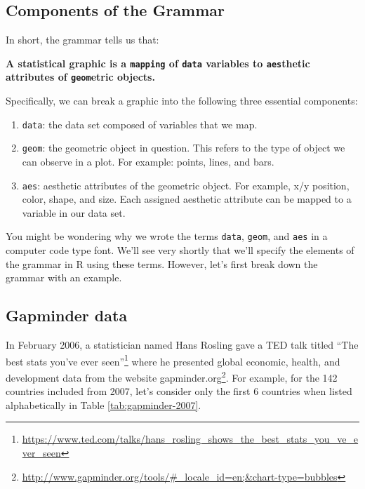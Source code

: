 \documentclass[12pt, krantz2,]{krantz}
\providecommand{\tightlist}{%
  \setlength{\itemsep}{0pt}\setlength{\parskip}{0pt}}
\renewenvironment{quote}{\begin{VF}}{\end{VF}}
\renewcommand{\href}[2]{#2\footnote{\url{#1}}}
\begin{document}
\hypertarget{components-of-the-grammar}{%
\subsection{Components of the Grammar}\label{components-of-the-grammar}}

In short, the grammar tells us that:

\begin{quote}
\textbf{A statistical graphic is a \texttt{mapping} of \texttt{data} variables to \texttt{aes}thetic attributes of \texttt{geom}etric objects.}
\end{quote}

Specifically, we can break a graphic into the following three essential components:

\begin{enumerate}
\def\labelenumi{\arabic{enumi}.}
\tightlist
\item
  \texttt{data}: the data set composed of variables that we map.
\item
  \texttt{geom}: the geometric object in question. This refers to the type of object we can observe in a plot. For example: points, lines, and bars.
\item
  \texttt{aes}: aesthetic attributes of the geometric object. For example, x/y position, color, shape, and size. Each assigned aesthetic attribute can be mapped to a variable in our data set.
\end{enumerate}

You might be wondering why we wrote the terms \texttt{data}, \texttt{geom}, and \texttt{aes} in a computer code type font. We'll see very shortly that we'll specify the elements of the grammar in R using these terms. However, let's first break down the grammar with an example.

\hypertarget{gapminder}{%
\subsection{Gapminder data}\label{gapminder}}

In February 2006, a statistician named Hans Rosling gave a TED talk titled \href{https://www.ted.com/talks/hans_rosling_shows_the_best_stats_you_ve_ever_seen}{``The best stats you've ever seen''} where he presented global economic, health, and development data from the website \href{http://www.gapminder.org/tools/\#_locale_id=en;\&chart-type=bubbles}{gapminder.org}. For example, for the 142 countries included from 2007, let's consider only the first 6 countries when listed alphabetically in Table \ref{tab:gapminder-2007}.
\end{document}
